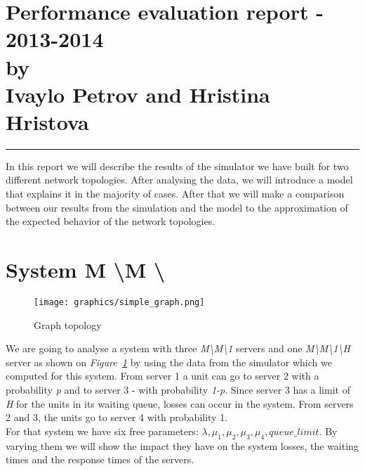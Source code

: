 \documentclass[12pt]{article}
\newcommand{\hr}{\rule{\linewidth}{0.1mm}}
\theoremstyle{plain}
\begin{document}
\section*{\centering
  Performance evaluation report - 2013-2014 \\
  by\\
  Ivaylo Petrov and Hristina Hristova 
}

\hr

In this report we will describe the results of the simulator we have built for
two different network topologies. After analysing the data, we will introduce a
model that explains it in the majority of cases. After that we will make a
comparison between our results from the simulation and the model to the
approximation of the expected behavior of the network topologies.

\section*{\textbf{System M \textbackslash M \textbackslash *}}

\begin{figure}[h]
  \caption{Graph topology}
  \texttt{[image: graphics/simple\_graph.png]}\\
  \label{fig:simple_graph}
\end{figure}

We are going to analyse a system with three \emph{M\textbackslash M\textbackslash 1}
servers and one \emph{M\textbackslash M\textbackslash 1\textbackslash H} server
as shown on \emph{Figure~\ref{fig:simple_graph}} by using the data from the simulator which we computed
for this system. From server 1 a unit can go to server 2 with a probability
\emph{p} and to server 3 - with probability \emph{1-p}. Since server 3 has a
limit of \emph{H} for the units in its waiting queue, losses can occur in the
system. From servers 2 and 3, the units go to server 4 with probability 1.\\
For that system we have six free parameters: $\lambda, \mu_1, \mu_2, \mu_3, \mu_4,
queue\_limit$. By varying them we will show the impact they have on the system
losses, the waiting times and the response times of the servers.
\end{document}
